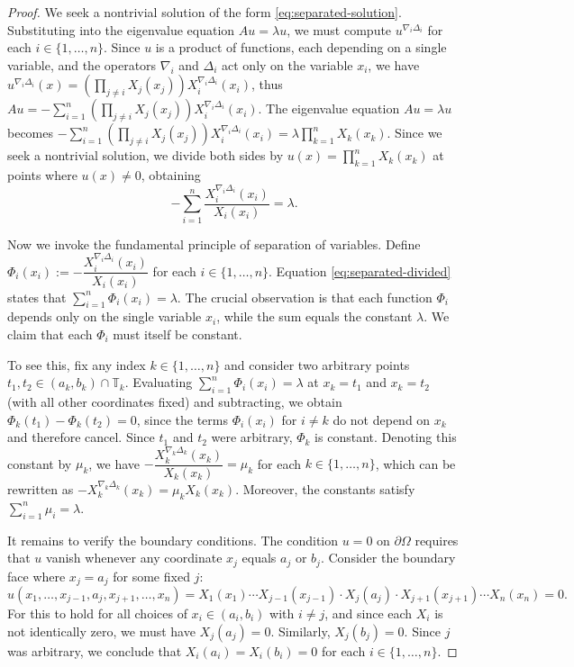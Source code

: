 \documentclass{article}
\numberwithin{equation}{section}
\numberwithin{theorem}{section}
\begin{document}
\begin{proof}
We seek a nontrivial solution of the form \eqref{eq:separated-solution}. Substituting into the eigenvalue equation $Au = \lambda u$, we must compute $u^{\nabla_i\Delta_i}$ for each $i \in \{1, \ldots, n\}$. Since $u$ is a product of functions, each depending on a single variable, and the operators $\nabla_i$ and $\Delta_i$ act only on the variable $x_i$, we have
$u^{\nabla_i\Delta_i}(x) = \left( \displaystyle\prod_{j \neq i} X_j(x_j) \right) X_i^{\nabla_i\Delta_i}(x_i)$, thus $Au = -\displaystyle\sum_{i=1}^{n} \left( \prod_{j \neq i} X_j(x_j) \right) X_i^{\nabla_i\Delta_i}(x_i)$. The eigenvalue equation $Au = \lambda u$ becomes $-\displaystyle\sum_{i=1}^{n} \left( \prod_{j \neq i} X_j(x_j) \right) X_i^{\nabla_i\Delta_i}(x_i) = \lambda \prod_{k=1}^{n} X_k(x_k)$. Since we seek a nontrivial solution, we divide both sides by $u(x) = \displaystyle\prod_{k=1}^{n} X_k(x_k)$ at points where $u(x) \neq 0$, obtaining
\begin{equation}\label{eq:separated-divided}
-\sum_{i=1}^{n} \frac{X_i^{\nabla_i\Delta_i}(x_i)}{X_i(x_i)} = \lambda.
\end{equation}

Now we invoke the fundamental principle of separation of variables. Define $\Phi_i(x_i) := -\dfrac{X_i^{\nabla_i\Delta_i}(x_i)}{X_i(x_i)}$ for each $i \in \{1, \ldots, n\}$. Equation \eqref{eq:separated-divided} states that $\displaystyle\sum_{i=1}^{n} \Phi_i(x_i) = \lambda$. The crucial observation is that each function $\Phi_i$ depends only on the single variable $x_i$, while the sum equals the constant $\lambda$. We claim that each $\Phi_i$ must itself be constant.

To see this, fix any index $k \in \{1, \ldots, n\}$ and consider two arbitrary points $t_1, t_2 \in (a_k, b_k) \cap \mathbb{T}_k$. Evaluating $\displaystyle\sum_{i=1}^{n} \Phi_i(x_i) = \lambda$ at $x_k = t_1$ and $x_k = t_2$ (with all other coordinates fixed) and subtracting, we obtain $\Phi_k(t_1) - \Phi_k(t_2) = 0$, since the terms $\Phi_i(x_i)$ for $i \neq k$ do not depend on $x_k$ and therefore cancel. Since $t_1$ and $t_2$ were arbitrary, $\Phi_k$ is constant. Denoting this constant by $\mu_k$, we have $-\dfrac{X_k^{\nabla_k\Delta_k}(x_k)}{X_k(x_k)} = \mu_k$ for each $k \in \{1, \ldots, n\}$, which can be rewritten as $-X_k^{\nabla_k\Delta_k}(x_k) = \mu_k X_k(x_k)$. Moreover, the constants satisfy $\displaystyle\sum_{i=1}^{n} \mu_i = \lambda$.

It remains to verify the boundary conditions. The condition $u = 0$ on $\partial\Omega$ requires that $u$ vanish whenever any coordinate $x_j$ equals $a_j$ or $b_j$. Consider the boundary face where $x_j = a_j$ for some fixed $j$:
$$u(x_1, \ldots, x_{j-1}, a_j, x_{j+1}, \ldots, x_n) = X_1(x_1) \cdots X_{j-1}(x_{j-1}) \cdot X_j(a_j) \cdot X_{j+1}(x_{j+1}) \cdots X_n(x_n) = 0.$$
For this to hold for all choices of $x_i \in (a_i, b_i)$ with $i \neq j$, and since each $X_i$ is not identically zero, we must have $X_j(a_j) = 0$. Similarly, $X_j(b_j) = 0$. Since $j$ was arbitrary, we conclude that $X_i(a_i) = X_i(b_i) = 0$ for each $i \in \{1, \ldots, n\}$.


\end{proof}
\end{document}
